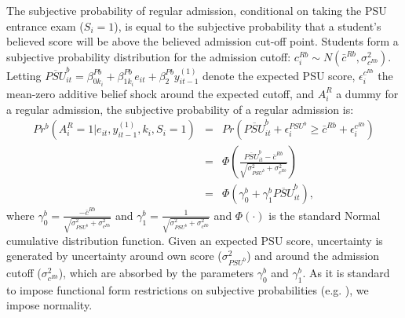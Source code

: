 The subjective probability of regular admission, conditional on taking the PSU entrance exam ($S_i=1$), is equal to the subjective probability that a student's believed score will be above the believed admission cut-off point. Students form a subjective probability distribution for the admission cutoff: $c_i^{Rb}\sim N(\bar{c}^{Rb},\sigma^2_{c^{Rb}})$. Letting $\overline{PSU}^b_{it}=\beta^{Pb}_{0k_i}+\beta^{Pb}_{1k_i} e_{it} +\beta^{Pb}_2 y^{(1)}_{it-1}$ denote the expected PSU score, $\epsilon_i^{c^{Rb}}$ the mean-zero additive belief shock around the expected cutoff, and $A^R_i$ a dummy for a regular admission, the subjective probability of a regular admission is:
\vspace{-12pt}
\begin{eqnarray}\label{eq:pr_Rb}
	Pr^b(A^R_i=1|e_{it},y_{it-1}^{(1)},k_i,S_i=1)&=&Pr\left( \overline{PSU}^b_{it}+\epsilon_i^{PSU^b}\geq \bar{c}^{Rb}+\epsilon_i^{c^{Rb}} \right)\\ \nonumber
	&=&\Phi \left( \frac{\overline{PSU}^b_{it}-\bar{c}^{Rb}}{\sqrt{\sigma^{2}_{PSU^b}+\sigma^2_{c^{Rb}}}}\right) \\ \nonumber
	&=&\Phi\left(\gamma_0^b +\gamma_1^b \overline{PSU}^b_{it}\right),
\end{eqnarray}
\noindent where $\gamma_0^b=\frac{-\bar{c}^{Rb}}{\sqrt{\sigma^{2}_{PSU^b}+\sigma^2_{c^{Rb}}}}$ and $\gamma_1^b=\frac{1}{\sqrt{\sigma^{2}_{PSU^b}+\sigma^2_{c^{Rb}}}}$ and $\Phi(\cdot)$ is the standard Normal cumulative distribution function. Given an expected PSU score, uncertainty is generated by uncertainty around own score ($\sigma^{2}_{PSU^b}$) and around the admission cutoff ($\sigma^2_{c^{Rb}}$), which are absorbed by the parameters $\gamma_0^b$ and $\gamma_1^b$. As it is standard  to impose functional form restrictions on subjective probabilities (e.g. \citealp{delavande2019university,kapor2020heterogeneous}), we impose normality.\par 

